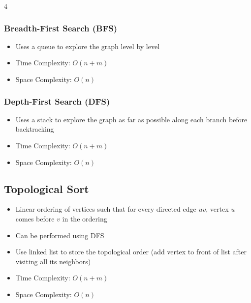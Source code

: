 \documentclass[fontsize=6pt, landscape, a4paper]{scrartcl}
\begin{document}
\begin{multicols*}{4}
    \subsubsection*{Breadth-First Search (BFS)}
    \begin{itemize}
        \item Uses a queue to explore the graph level by level
        \item Time Complexity: $O(n + m)$
        \item Space Complexity: $O(n)$
    \end{itemize}

    \subsubsection*{Depth-First Search (DFS)}
    \begin{itemize}
        \item Uses a stack to explore the graph as far as possible along each branch before
              backtracking
        \item Time Complexity: $O(n + m)$
        \item Space Complexity: $O(n)$
    \end{itemize}

    \subsection*{Topological Sort}
    \begin{itemize}
        \item Linear ordering of vertices such that for every directed edge $uv$, vertex $u$
              comes before $v$ in the ordering
        \item Can be performed using DFS
        \item Use linked list to store the topological order (add vertex to front of list
              after visiting all its neighbors)
        \item Time Complexity: $O(n + m)$
        \item Space Complexity: $O(n)$
    \end{itemize}


\end{multicols*}
\end{document}
